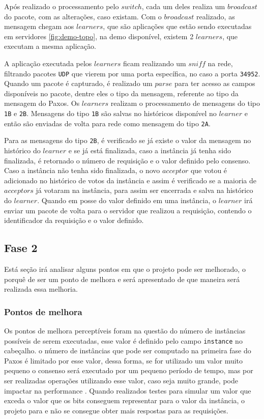 \documentclass[12pt,
openright, 
oneside,
a4paper,
brazil]{facom-ufu-abntex2}
\theoremstyle{definition}
\begin{document}


Após realizado o processamento pelo $switch$, cada um deles realiza um $broadcast$ do pacote,
com as alterações, caso existam. Com o $broadcast$ realizado, as mensagem chegam aos
$learners$, que são aplicações que estão sendo executadas em servidores \ref{fig:demo-topo}, 
na demo disponível, existem 2 $learners$, que executam a mesma aplicação.

A aplicação executada pelos $learners$ ficam realizando um $sniff$ na rede, filtrando pacotes
\texttt{UDP} que vierem por uma porta específica, no caso a porta \texttt{34952}. Quando um
pacote é capturado, é realizado um $parse$ para ter acesso as campos disponíveis no pacote, dentre
eles o tipo da mensagem, referente ao tipo da mensagem do Paxos. Os $learners$ realizam o processamento
de mensagens do tipo \texttt{1B} e \texttt{2B}. Mensagens do tipo \texttt{1B} são salvas no históricos
disponível no $learner$ e então são enviadas de volta para rede como mensagem do tipo \texttt{2A}.

Para as mensagens do tipo \texttt{2B}, é verificado se já existe o valor da mensagem no histórico
do $learner$ e se já está finalizada, caso a instância já tenha sido finalizada, é retornado o
número de requisição e o valor definido pelo consenso. Caso a instância não tenha sido finalizada,
o novo $acceptor$ que votou é adicionado no histórico de votos da instância e assim é verificado
se a maioria de $acceptors$ já votaram na instância, para assim ser encerrada e salva na histórico
do $learner$. Quando em posse do valor definido em uma instância, o $learner$ irá enviar um pacote de 
volta para o servidor que realizou a requisição, contendo o identificador da requisição e o valor definido.

\subsection{Fase 2}
Está seção irá analisar alguns pontos em que o projeto pode ser melhorado, o porquê de ser um ponto de
melhora e será apresentado de que maneira será realizada essa melhoria.

\subsubsection{Pontos de melhora}
Os pontos de melhora perceptíveis foram na questão do número de instâncias possíveis de serem executadas,
esse valor é definido pelo campo \texttt{instance} no cabeçalho. o número de instâncias que pode ser 
computado na primeira fase do Paxos é limitado por esse valor, dessa forma, se for utilizado um valor
muito pequeno o consenso será executado por um pequeno período de tempo, mas por ser realizadas operações
utilizando esse valor, caso seja muito grande, pode impactar na performance \citep{dang2016paxos}. 
Quando realizados testes para simular um valor que exceda o valor que os bits conseguem representar 
para o valor da instância, o projeto para e não se consegue obter mais respostas para as requisições.
\end{document}
